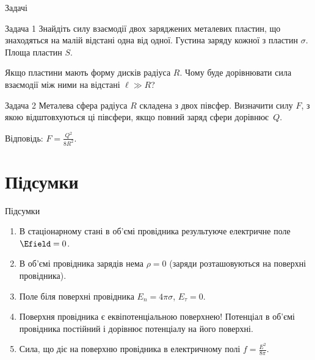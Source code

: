 \documentclass[onlytextwidth]{beamer}
\begin{document}
\begin{frame}{Задачі}{}
	\begin{exampleblock}{Задача 1}\justifying
		Знайдіть силу взаємодії двох заряджених металевих пластин, що знаходяться на малій відстані
		одна від одної. Густина заряду кожної з пластин $\sigma$. Площа пластин $S$.

		\medskip

		Якщо пластини мають форму дисків радіуса $R$. Чому буде дорівнювати сила взаємодії між ними на
		відстані $\ell \gg R$?
	\end{exampleblock}


	\begin{exampleblock}{Задача 2}\justifying
		Металева сфера радіуса $R$ складена з двох півсфер. Визначити силу $F$, з якою відштовхуються
		ці півсфери, якщо повний заряд сфери дорівнює~$Q$.

		\bigskip

		Відповідь: $F= \frac{Q^2}{8R^2}$.
	\end{exampleblock}
\end{frame}




\section*{{Підсумки}}



\begin{frame}{Підсумки}{}
\begin{enumerate}
\item В стаціонарному стані в об'ємі провідника результуюче електричне поле $\Efield = 0$.
\item В об'ємі провідника зарядів нема $\rho = 0$ (заряди розташовуються на поверхні провідника).
\item Поле біля поверхні провідника $E_n = 4\pi\sigma$, $E_{\tau} = 0$.
\item Поверхня провідника є еквіпотенціальною поверхнею! Потенціал в об'ємі провідника
постійний і дорівнює потенціалу на його поверхні.
\item Сила, що діє на поверхню провідника в електричному полі $f = \frac{E^2}{8\pi}$.
\end{enumerate}
\end{frame}
\end{document}
